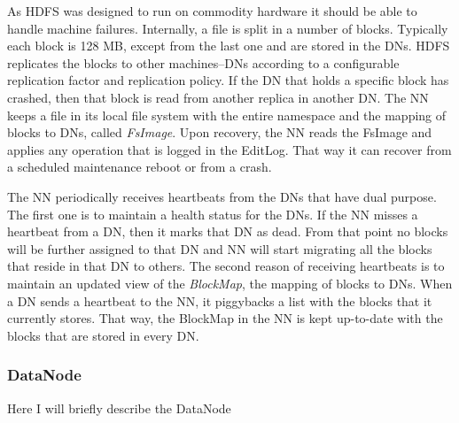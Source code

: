 As HDFS was designed to run on commodity
hardware it should be able to handle machine failures. Internally, a
file is split in a number of blocks. Typically each block is 128 MB,
except from the last one and are stored
in the DNs. HDFS replicates the blocks to other machines--DNs
according to a configurable replication factor and replication policy.
If the DN that holds a specific block has crashed, then that block is read from
another replica in another DN.
The NN keeps a file in its local file system with the entire namespace
and the mapping of blocks to DNs, called \emph{FsImage}. Upon
recovery, the NN reads the FsImage and applies any operation that is
logged in the EditLog. That way it can recover from a scheduled
maintenance reboot or from a crash.

The NN periodically receives heartbeats from the DNs that have dual
purpose. The first one is to maintain a health status for the DNs. If
the NN misses a heartbeat from a DN, then it marks that DN as
dead. From that point no blocks will be further assigned to that DN
and NN will start migrating all the blocks that reside in that DN to
others. The second reason of receiving heartbeats is to maintain an
updated view of the \emph{BlockMap}, the mapping of blocks to
DNs. When a DN sends a heartbeat to the NN, it piggybacks a list with
the blocks that it currently stores. That way, the BlockMap in the NN
is kept up-to-date with the blocks that are stored in every DN.

\subsubsection{DataNode}
\label{sssec:dn}

Here I will briefly describe the DataNode
